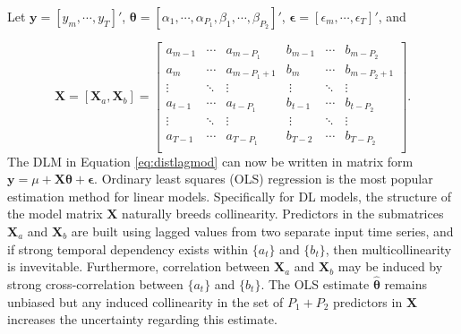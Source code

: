 Let $\bm{y}=[y_m,\cdots,y_{T}]'$, $\bm{\theta}=[\alpha_1,\cdots,\alpha_{P_1},\beta_1,\cdots,\beta_{P_2}]'$, $\bm{\epsilon}=[\epsilon_m,\cdots,\epsilon_{T}]'$, and 

\begin{equation*}
\bm{X}=[\bm{X}_a,\bm{X}_b]=
	\begin{bmatrix} a_{m-1} & \cdots & a_{m-P_1} &
					b_{m-1} & \cdots & b_{m-P_2} \\
					a_{m} & \cdots & a_{m-P_1+1} &
					b_{m} & \cdots & b_{m-P_2+1} \\
					\vdots & \ddots & \vdots &\
					\vdots &  \ddots & \vdots  \\
					a_{t-1} & \cdots & a_{t-P_1} &
					b_{t-1} & \cdots & b_{t-P_2} \\
					\vdots & \ddots & \vdots &\
					\vdots &  \ddots & \vdots  \\
					a_{T-1} & \cdots & a_{T-P_1} &
					b_{T-2} & \cdots & b_{T-P_2} \\
	\end{bmatrix} .
\end{equation*}
The DLM in Equation \ref{eq:distlagmod} can now be written in matrix form $\bm{y}=\mu+\bm{X}\bm{\theta}+\bm{\epsilon}$.  Ordinary least squares (OLS) regression is the most popular estimation method for linear models. Specifically for DL models, the structure of the model matrix $\bm{X}$ naturally breeds collinearity. Predictors in the submatrices $\bm{X}_a$ and $\bm{X}_b$ are built using lagged values from two separate input time series, and if strong temporal dependency exists within $\{a_t\}$ and $\{b_t\}$, then multicollinearity is invevitable. Furthermore, correlation between $\bm{X}_a$ and $\bm{X}_b$ may be induced by strong cross-correlation between $\{a_t\}$ and $\{b_t\}$. The OLS estimate $\hat{\bm{\theta}}$ remains unbiased but any induced collinearity in the set of $P_1+P_2$ predictors in $\bm{X}$ increases the uncertainty regarding this estimate.

